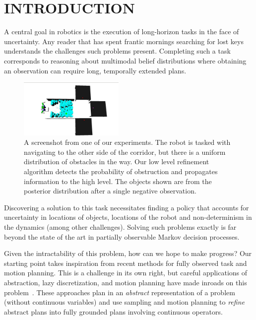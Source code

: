 \section{INTRODUCTION}
A central goal in robotics is the execution of long-horizon tasks in
the face of uncertainty. Any reader that has spent frantic mornings
searching for lost keys understands the challenges such problems
present. Completing such a task corresponds to reasoning about
multimodal belief distributions where obtaining an observation
can require long, temporally extended plans. 
\begin{figure}[h]
  \centering
    \noindent
    \includegraphics[width=0.45\textwidth]{corridor_images/obj_at_true_loc.png}
  \caption{A screenshot from one of our experiments. The robot is
    tasked with navigating to the other side of the corridor, but
    there is a uniform distribution of obstacles in the way. Our low
    level refinement algorithm detects the probability of obstruction and
    propagates information to the high level. The objects shown are
    from the posterior distribution after a single negative
    observation.}
  \label{fig:knot_steps}
\end{figure}


Discovering a solution to this task necessitates finding a policy that
accounts for uncertainty in locations of objects, locations of the
robot and non-determinism in the dynamics (among other
challenges). Solving such problems exactly is far beyond the state of
the art in partially observable Markov decision processes.

Given the intractability of this problem, how can we hope to make
progress? Our starting point takes inspiration from recent methods for
fully observed task and motion planning.  This is a challenge in its
own right, but careful applications of abstraction, lazy
discretization, and motion planning have made inroads on this
problem~\cite{srivastava2014combined, lozano2014constraint}. These
approaches plan in an \emph{abstract} representation of a problem
(without continuous variables) and use sampling and motion planning to
\emph{refine} abstract plans into fully grounded plans involving continuous
operators.

